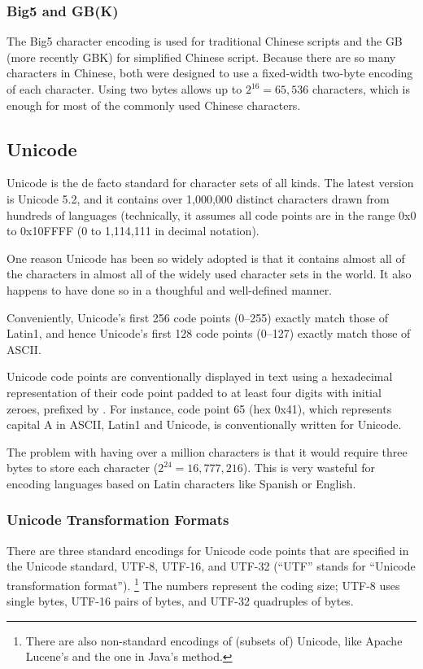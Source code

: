 \subsubsection{Big5 and GB(K)}

The Big5 character encoding is used for traditional Chinese scripts
and the GB (more recently GBK) for simplified Chinese script.  Because
there are so many characters in Chinese, both were designed to use a
fixed-width two-byte encoding of each character.  Using two bytes
allows up to $2^{16} = 65,536$ characters, which is enough for most
of the commonly used Chinese characters.

\subsection{Unicode}

Unicode is the de facto standard for character sets of all kinds.  The
latest version is Unicode 5.2, and it contains over 1,000,000 distinct
characters drawn from hundreds of languages (technically, it assumes
all code points are in the range 0x0 to 0x10FFFF (0 to 1,114,111 in
decimal notation).

One reason Unicode has been so widely adopted is that it contains
almost all of the characters in almost all of the widely used
character sets in the world.  It also happens to have done so in a
thoughful and well-defined manner.

Conveniently, Unicode's first 256 code points (0--255) exactly match
those of Latin1, and hence Unicode's first 128 code points (0--127)
exactly match those of ASCII.

Unicode code points are conventionally displayed in text using a
hexadecimal representation of their code point padded to at least four
digits with initial zeroes, prefixed by .  For instance, code
point 65 (hex 0x41), which represents capital A in ASCII, Latin1 and
Unicode, is conventionally written  for Unicode.

The problem with having over a million characters is that it would
require three bytes to store each character ($2^{24} = 16,777,216$).
This is very wasteful for encoding languages based on Latin characters
like Spanish or English.

\subsubsection{Unicode Transformation Formats}

There are three standard encodings for Unicode code points that are
specified in the Unicode standard, UTF-8, UTF-16, and UTF-32 (``UTF''
stands for ``Unicode transformation format'').%
%
\footnote{There are also non-standard encodings of (subsets of) 
Unicode, like Apache Lucene's and the one in Java's
 method.}
%
The numbers represent the coding size; UTF-8 uses single bytes,
UTF-16 pairs of bytes, and UTF-32 quadruples of bytes.

